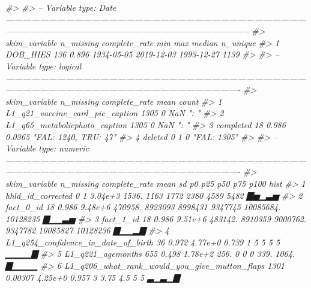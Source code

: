 \documentclass[]{article}
\newenvironment{Shaded}{\begin{snugshade}}{\end{snugshade}}
\newcommand{\CommentTok}[1]{\textcolor[rgb]{0.56,0.35,0.01}{\textit{#1}}}
\begin{document}
\begin{Shaded}
\begin{Highlighting}[]
\CommentTok{#> }
\CommentTok{#> -- Variable type: Date ----------------------------------------------------------------------------------------------------------------------------------------------------------------------------------------------}
\CommentTok{#>   skim_variable n_missing complete_rate min        max        median     n_unique}
\CommentTok{#> 1 DOB_HIES            136         0.896 1934-05-05 2019-12-03 1993-12-27     1139}
\CommentTok{#> }
\CommentTok{#> -- Variable type: logical -------------------------------------------------------------------------------------------------------------------------------------------------------------------------------------------}
\CommentTok{#>   skim_variable                   n_missing complete_rate     mean count               }
\CommentTok{#> 1 L1_q21_vaccine_card_pic_caption      1305         0     NaN      ": "                }
\CommentTok{#> 2 L1_q65_metabolicphoto_caption        1305         0     NaN      ": "                }
\CommentTok{#> 3 completed                              18         0.986   0.0365 "FAL: 1240, TRU: 47"}
\CommentTok{#> 4 deleted                                 0         1       0      "FAL: 1305"         }
\CommentTok{#> }
\CommentTok{#> -- Variable type: numeric -------------------------------------------------------------------------------------------------------------------------------------------------------------------------------------------}
\CommentTok{#>    skim_variable                                           n_missing complete_rate    mean           sd          p0         p25         p50         p75        p100 hist }
\CommentTok{#>  1 hhld_id_corrected                                               0       1       3.04e+3   1536.          1163        1772        2380        4589        5482    ▇▅▁▃▅}
\CommentTok{#>  2 fact_0_id                                                      18       0.986   9.48e+6 470958.       8923093     8998431     9347745    10085684.   10128235    ▇▁▁▃▅}
\CommentTok{#>  3 fact_1_id                                                      18       0.986   9.51e+6 483142.       8910359     9000762.    9347782    10085827    10128236    ▇▁▁▂▇}
\CommentTok{#>  4 L1_q254_confidence_in_date_of_birth                            36       0.972   4.77e+0      0.739          1           5           5           5           5    ▁▁▁▁▇}
\CommentTok{#>  5 L1_q221_agemonths                                             655       0.498   1.78e+2    256.             0           0           0         339.       1064.   ▇▁▁▁▁}
\CommentTok{#>  6 L1_q206_what_rank_would_you_give_mutton_flaps                1301       0.00307 4.25e+0      0.957          3           3.75        4.5         5           5    ▃▁▃▁▇}

\end{Highlighting}
\end{Shaded}
\end{document}
